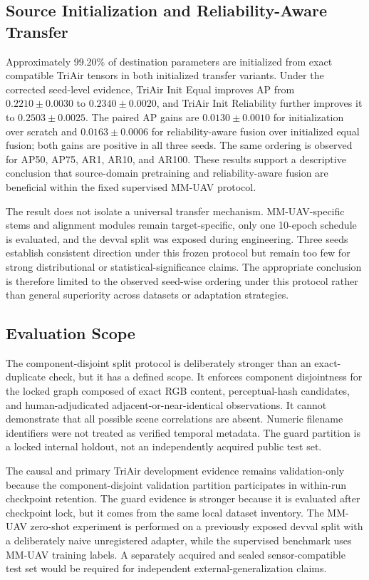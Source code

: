 \subsection{Source Initialization and Reliability-Aware Transfer}
Approximately 99.20\% of destination parameters are initialized from exact compatible TriAir tensors in both initialized transfer variants. Under the corrected seed-level evidence, TriAir Init Equal improves AP from $0.2210\pm0.0030$ to $0.2340\pm0.0020$, and TriAir Init Reliability further improves it to $0.2503\pm0.0025$. The paired AP gains are $0.0130\pm0.0010$ for initialization over scratch and $0.0163\pm0.0006$ for reliability-aware fusion over initialized equal fusion; both gains are positive in all three seeds. The same ordering is observed for AP50, AP75, AR1, AR10, and AR100. These results support a descriptive conclusion that source-domain pretraining and reliability-aware fusion are beneficial within the fixed supervised MM-UAV protocol.

The result does not isolate a universal transfer mechanism. MM-UAV-specific stems and alignment modules remain target-specific, only one 10-epoch schedule is evaluated, and the devval split was exposed during engineering. Three seeds establish consistent direction under this frozen protocol but remain too few for strong distributional or statistical-significance claims. The appropriate conclusion is therefore limited to the observed seed-wise ordering under this protocol rather than general superiority across datasets or adaptation strategies.

\subsection{Evaluation Scope}
The component-disjoint split protocol is deliberately stronger than an exact-duplicate check, but it has a defined scope. It enforces component disjointness for the locked graph composed of exact RGB content, perceptual-hash candidates, and human-adjudicated adjacent-or-near-identical observations. It cannot demonstrate that all possible scene correlations are absent. Numeric filename identifiers were not treated as verified temporal metadata. The guard partition is a locked internal holdout, not an independently acquired public test set.

The causal and primary TriAir development evidence remains validation-only because the component-disjoint validation partition participates in within-run checkpoint retention. The guard evidence is stronger because it is evaluated after checkpoint lock, but it comes from the same local dataset inventory. The MM-UAV zero-shot experiment is performed on a previously exposed devval split with a deliberately naive unregistered adapter, while the supervised benchmark uses MM-UAV training labels. A separately acquired and sealed sensor-compatible test set would be required for independent external-generalization claims.

